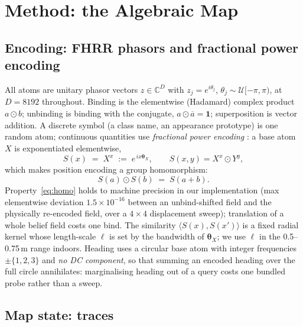\documentclass[conference]{IEEEtran}
\newcommand{\bnd}{\odot}
\newcommand{\conj}[1]{\overline{#1}}
\begin{document}
\section{Method: the Algebraic Map}
\label{sec:method}

\subsection{Encoding: FHRR phasors and fractional power encoding}
\label{sec:encoding}

All atoms are unitary phasor vectors $z \in \mathbb{C}^{D}$ with
$z_j = e^{i\theta_j}$, $\theta_j \sim \mathcal{U}[-\pi,\pi)$, at
$D=8192$ throughout. Binding is the elementwise (Hadamard) complex
product $a \bnd b$; unbinding is binding with the conjugate,
$a \bnd \conj{a} = \mathbf{1}$; superposition is vector addition. A
discrete symbol (a class name, an appearance prototype) is one random
atom; continuous quantities use \emph{fractional power encoding}
\cite{komer2019neural}: a base atom $X$ is exponentiated elementwise,
\begin{equation}
S(x) \;=\; X^{x} \;:=\; e^{\,i x \boldsymbol{\theta}_X}, \qquad
S(x,y) = X^{x} \bnd Y^{y},
\label{eq:fpe}
\end{equation}
which makes position encoding a group homomorphism:
\begin{equation}
S(a) \bnd S(b) \;=\; S(a+b).
\label{eq:homo}
\end{equation}
Property~\eqref{eq:homo} holds to machine precision in our implementation
(max elementwise deviation $1.5\times10^{-16}$ between an unbind-shifted
field and the physically re-encoded field, over a $4\times4$ displacement
sweep); translation of a whole belief field costs one bind. The
similarity $\langle S(x), S(x')\rangle$ is a fixed radial kernel whose
length-scale $\ell$ is set by the bandwidth of
$\boldsymbol{\theta}_X$; we use $\ell$ in the 0.5--0.75\,m range
indoors. Heading uses a circular base atom with integer frequencies
$\pm\{1,2,3\}$ and \emph{no DC component}, so that summing an encoded
heading over the full circle annihilates: marginalising heading out of a
query costs one bundled probe rather than a sweep.

\subsection{Map state: traces}
\label{sec:traces}
\end{document}
